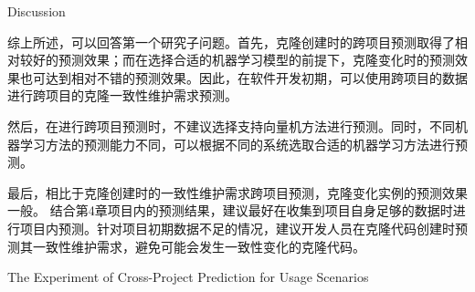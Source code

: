 
{Discussion}

综上所述，可以回答第一个研究子问题。首先，克隆创建时的跨项目预测取得了相对较好的预测效果；而在选择合适的机器学习模型的前提下，克隆变化时的预测效果也可达到相对不错的预测效果。因此，在软件开发初期，可以使用跨项目的数据进行跨项目的克隆一致性维护需求预测。

然后，在进行跨项目预测时，不建议选择支持向量机方法进行预测。同时，不同机器学习方法的预测能力不同，可以根据不同的系统选取合适的机器学习方法进行预测。

最后，相比于克隆创建时的一致性维护需求跨项目预测，克隆变化实例的预测效果一般。
结合第4章项目内的预测结果，建议最好在收集到项目自身足够的数据时进行项目内预测。针对项目初期数据不足的情况，建议开发人员在克隆代码创建时预测其一致性维护需求，避免可能会发生一致性变化的克隆代码。

{The Experiment of Cross-Project Prediction for Usage Scenarios}

